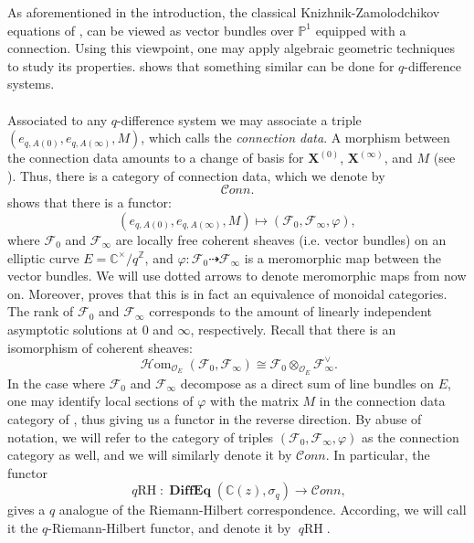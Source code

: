 \documentclass[a4paper]{report}
\theoremstyle{theorem}
\theoremstyle{definition}
\theoremstyle{remark}
\theoremstyle{proposition}
\theoremstyle{conjecture}
\theoremstyle{lemma}
\theoremstyle{corollary}
\theoremstyle{exercise}
\theoremstyle{example}
\newcommand{\C}{\mathbb{C}}
\newcommand{\mcal}{\mathcal}
\newcommand{\on}{\operatorname}
\newcommand{\DiffEq}{\on{\mathbf{DiffEq}}}
\newcommand{\qRH}{\on{\mathit{q}RH}}
\begin{document}
  As aforementioned in the introduction, the classical Knizhnik-Zamolodchikov equations of 
  \cite{kz84}, can be viewed as vector bundles over $\mathbb{P}^1$ equipped with a connection. 
  Using this viewpoint, one may apply algebraic geometric techniques to study its properties. 
  \cite{sauloy03} shows that something similar can be done for $q$-difference systems. \\\\
  Associated to any $q$-difference system we may associate a triple 
  $(e_{q,A(0)}, e_{q,A(\infty)}, M)$, which \cite{sauloy03} calls 
  the \emph{connection data}. A morphism between the connection data amounts to a 
  change of basis for $\mathbf{X}^{(0)}$, $\mathbf{X}^{(\infty)}$, and $M$ (see 
  \cite[\S 3]{sauloy03}). Thus, there is a category of connection data, which we 
  denote by $$\mcal{C}onn.$$
  \cite[Theorem 2.3.2.1]{sauloy03} shows that there is a functor:
  \begin{equation}
      (e_{q,A(0)}, e_{q,A(\infty)}, M) \longmapsto (\mcal{F}_0,\mcal{F}_\infty, \varphi),
  \end{equation}
  where $\mcal{F}_0$ and $\mcal{F}_\infty$ are locally free coherent sheaves (i.e. vector bundles)
  on an elliptic curve $E = \C^\times/q^{\mathbb{Z}}$, and 
  $\varphi : \mcal{F}_0 \dashrightarrow \mcal{F}_\infty$ is a meromorphic map between the vector bundles. We will use dotted arrows to denote meromorphic 
  maps from now on.
  Moreover, \cite[Theorem 2.3.2.1]{sauloy03} proves that this is in fact an equivalence of monoidal categories.
  The rank of $\mcal{F}_0$ and $\mcal{F}_\infty$ corresponds to 
  the amount of linearly independent asymptotic solutions at $0$ and $\infty$, respectively.
  Recall that there is an isomorphism of coherent sheaves:
  $$\on{\mathscr{H}om}_{\mcal{O}_E}(\mcal{F}_0,\mcal{F}_\infty) \cong \mcal{F}_0\otimes_{\mcal{O}_E}\mcal{F}_\infty^\vee.$$
  In the case where $\mcal{F}_0$ and $\mcal{F}_\infty$ decompose as a direct sum
  of line bundles on $E$, one may identify local sections of $\varphi$ with 
  the matrix $M$ in the connection data category of \cite{sauloy03}, thus 
  giving us a functor in the reverse direction.
  By abuse of notation, we will refer to the category of triples $(\mcal{F}_0,\mcal{F}_\infty,\varphi)$ as the connection category as well, and we will similarly 
  denote it by $\mcal{C}onn$. In particular, the functor 
  $$\qRH : \DiffEq(\C(z),\sigma_q) \longrightarrow \mcal{C}onn,$$
  gives a $q$ analogue of the Riemann-Hilbert correspondence. According, we will call it
  the $q$-Riemann-Hilbert functor, and denote it by $\qRH$.
\end{document}
